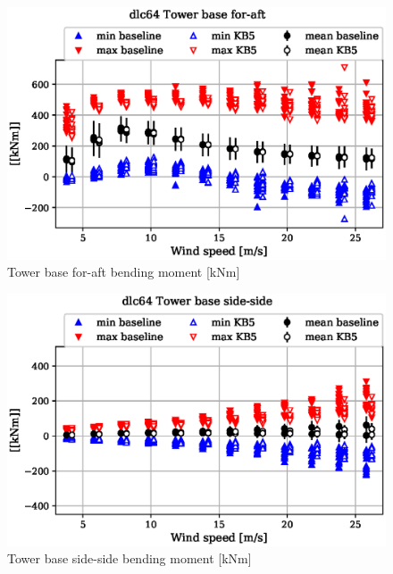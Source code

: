 \begin{figure}[!ht]
\begin{center}
	\includegraphics[width=.85\linewidth]{figures/baseline-vs-KB6/dlc64/tower-tower-node-001-momentvec-x_AA0007_AA0003.eps}
\end{center}
\caption{Tower base for-aft bending moment [kNm]}
\label{fig:baseline-vs-KB6:dlc64:tower-base-fa}
\end{figure}

\begin{figure}[!ht]
\begin{center}
	\includegraphics[width=.85\linewidth]{figures/baseline-vs-KB6/dlc64/tower-tower-node-001-momentvec-y_AA0007_AA0003.eps}
\end{center}
\caption{Tower base side-side bending moment [kNm]}
\label{fig:baseline-vs-KB6:dlc64:tower-base-ss}
\end{figure}

